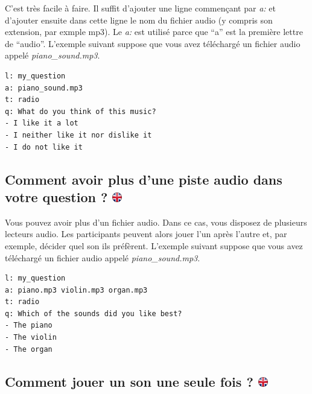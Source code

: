 \documentclass[
]{book}
\begin{document}
C'est très facile à faire. Il suffit d'ajouter une ligne commençant par \emph{a:} et d'ajouter ensuite dans cette ligne le nom du fichier audio (y compris son extension, par exmple mp3). Le \emph{a:} est utilisé parce que ``a'' est la première lettre de ``audio''. L'exemple suivant suppose que vous avez téléchargé un fichier audio appelé \emph{piano\_sound.mp3}.

\begin{verbatim}
l: my_question
a: piano_sound.mp3
t: radio
q: What do you think of this music?
- I like it a lot
- I neither like it nor dislike it
- I do not like it
\end{verbatim}

\hypertarget{comment-avoir-plus-dune-piste-audio-dans-votre-question}{%
\subsection[Comment avoir plus d'une piste audio dans votre question ? ]{\texorpdfstring{Comment avoir plus d'une piste audio dans votre question ? \href{https://www.psytoolkit.org/lessons/surveyaudiovideo.html\#_how_to_have_more_than_one_audio_track_in_your_question}{\protect\includegraphics{img/ukflag.png}}}{Comment avoir plus d'une piste audio dans votre question ? }}\label{comment-avoir-plus-dune-piste-audio-dans-votre-question}}

Vous pouvez avoir plus d'un fichier audio. Dans ce cas, vous disposez de plusieurs lecteurs audio. Les participants peuvent alors jouer l'un après l'autre et, par exemple, décider quel son ils préfèrent. L'exemple suivant suppose que vous avez téléchargé un fichier audio appelé \emph{piano\_sound.mp3}.

\begin{verbatim}
l: my_question
a: piano.mp3 violin.mp3 organ.mp3
t: radio
q: Which of the sounds did you like best?
- The piano
- The violin
- The organ
\end{verbatim}

\hypertarget{comment-jouer-un-son-une-seule-fois}{%
\subsection[Comment jouer un son une seule fois ? ]{\texorpdfstring{Comment jouer un son une seule fois ? \href{https://www.psytoolkit.org/lessons/surveyaudiovideo.html\#_how_to_play_a_sound_only_one_time}{\protect\includegraphics{img/ukflag.png}}}{Comment jouer un son une seule fois ? }}\label{comment-jouer-un-son-une-seule-fois}}
\end{document}
